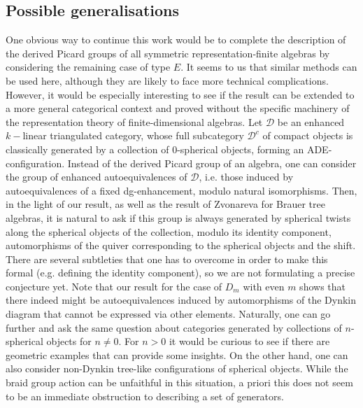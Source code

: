 \documentclass[12pt]{amsart}
\theoremstyle{plain}
\theoremstyle{remark}
\theoremstyle{definition}
\begin{document}
\subsection{Possible generalisations} One obvious way to continue this work would be to complete the description of the derived Picard groups of all symmetric representation-finite algebras by considering the remaining case of type $E$. It seems to us that similar methods can be used here, although they are likely to face more technical complications. However, it would be especially interesting to see if the result can be extended to a more general categorical context and proved without the specific machinery of the representation theory of finite-dimensional algebras. Let $\mathcal{D}$ be an enhanced $k-$linear triangulated category, whose full subcategory $\mathcal{D}^c$ of compact objects is classically generated by a collection of $0$-spherical objects, forming an ADE-configuration. Instead of the derived Picard group of an algebra, one can consider the group of enhanced autoequivalences of $\mathcal{D}$, i.e. those induced by autoequivalences of a fixed dg-enhancement, modulo natural isomorphisms. Then, in the light of our result, as well as the result of Zvonareva \cite{Alexandra} for Brauer tree algebras, it is natural to ask if this group is always generated by spherical twists along the spherical objects of the collection, modulo its identity component, automorphisms of the quiver corresponding to the spherical objects and the shift. There are several subtleties that one has to overcome in order to make this formal (e.g. defining the identity component), so we are not formulating a precise conjecture yet. Note that our result for the case of $D_m$ with even $m$ shows that there indeed might be autoequivalences induced by automorphisms of the Dynkin diagram that cannot be expressed via other elements. Naturally, one can go further and ask the same question about categories generated by collections of $n$-spherical objects for $n \neq 0$. For $n > 0$ it would be curious to see if there are geometric examples that can provide some insights. On the other hand, one can also consider non-Dynkin tree-like configurations of spherical objects. While the braid group action can be unfaithful in this situation, a priori this does not seem to be an immediate obstruction to describing a set of generators. 
\end{document}
